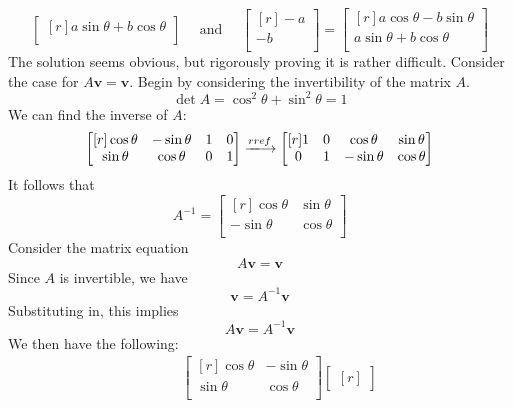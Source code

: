 \documentclass[12pt, letterpaper]{article}
\begin{document}
\begin{solution}
\[\begin{bmatrix}[r]
             a \sin \theta +b\cos \theta \\
       \end{bmatrix} \quad \text{ and } \quad \begin{bmatrix}[r]
         -a \\
         -b \\
       \end{bmatrix}= \begin{bmatrix}[r]
        a \cos \theta -b\sin \theta  \\
         a \sin \theta +b\cos \theta \\
   \end{bmatrix}
    \]
    The solution seems obvious, but rigorously proving it is rather difficult. Consider the case for \(A \mathbf{v}=\mathbf{v}\). Begin by considering the invertibility of the matrix \(A\).
    \[
        \det A = \cos ^2\theta +\sin ^2\theta =1
    \]
    We can find the inverse of \(A\):
    \[
        \begin{bmatrix}[r]
            \cos \theta  &-\sin \theta   &1  &0   \\
             \sin \theta &\cos \theta   &0  &1   \\
        \end{bmatrix}\xlongrightarrow{rref} \begin{bmatrix}[r]
            1 &0  &\cos \theta   &\sin \theta    \\
             0&1  &-\sin \theta   &\cos \theta    \\
        \end{bmatrix}
    \]
    It follows that 
    \[
        A^{-1} = \begin{bmatrix}[r]
            \cos \theta  &\sin \theta    \\
             -\sin \theta &\cos \theta    \\
        \end{bmatrix}
    \]
    Consider the matrix equation 
    \[
        A \mathbf{v}=\mathbf{v}
    \]
    Since \(A\) is invertible, we have 
    \[
        \mathbf{v}=A^{-1} \mathbf{v}
    \]
    Substituting in, this implies
    \[
        A \mathbf{v}= A^{-1} \mathbf{v}
    \]
    We then have the following:
    \begin{align*}
        &\qquad \begin{bmatrix}[r]
            \cos \theta  &-\sin \theta    \\
             \sin \theta &\cos \theta    \\
        \end{bmatrix} \begin{bmatrix}[r]

\end{bmatrix}
\end{align*}
\end{solution}
\end{document}
